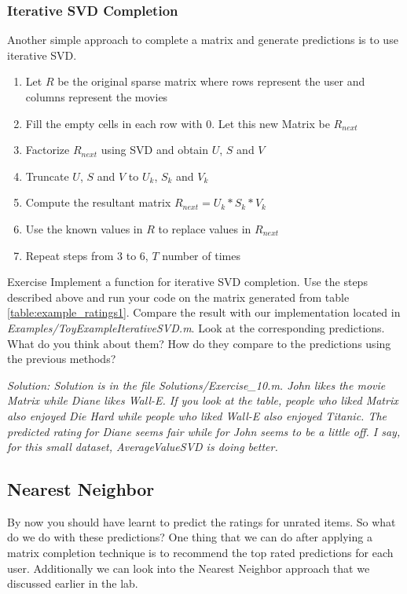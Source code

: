 \begin{enumerate}
  \subsubsection{Iterative SVD Completion}
  Another simple approach to complete a matrix and generate predictions is to use iterative SVD. 
  \begin{enumerate}
    \item Let $R$ be the original sparse matrix where rows represent the user and columns represent the movies
    \item Fill the empty cells in each row with 0. Let this new Matrix be $R_{next}$
    \item Factorize $R_{next}$ using SVD and obtain $U$, $S$ and $V$
    \item Truncate $U$, $S$ and $V$ to $U_k$, $S_k$ and $V_k$
    \item Compute the resultant matrix $R_{next} = U_k*S_k*V_k$
    \item Use the known values in $R$ to replace values in $R_{next}$
    \item Repeat steps from $3$ to $6$, $T$ number of times
  \end{enumerate}
\begin{myremark}{Exercise }
Implement a function for iterative SVD completion. Use the steps described above and run your code on the matrix generated from table \ref{table:example_ratings1}. Compare the result with our implementation located in \textit{Examples/ToyExampleIterativeSVD.m}. Look at the corresponding predictions. What do you think about them? How do they compare to the predictions using the previous methods?
\end{myremark}
\textit{Solution: Solution is in the file Solutions/Exercise\_10.m. John likes the movie Matrix while Diane likes Wall-E. If you look at the table, people who liked Matrix also enjoyed Die Hard while people who liked Wall-E also enjoyed Titanic. The predicted rating for Diane seems fair while for John seems to be a little off. I say, for this small dataset, AverageValueSVD is doing better.}
  \subsection{Nearest Neighbor}
  By now you should have learnt to predict the ratings for unrated items. So what do we do with these predictions? One thing that we can do after applying a matrix completion technique is to recommend the top rated predictions for each user. Additionally we can look into the Nearest Neighbor approach that we discussed earlier in the lab.

\end{enumerate}
